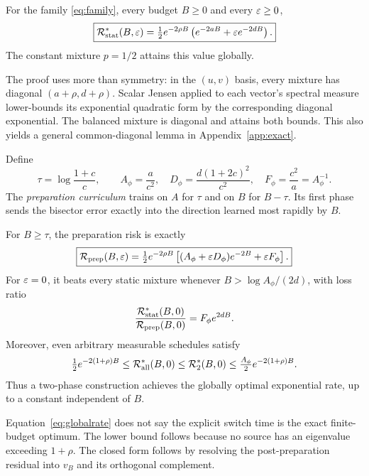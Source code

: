 \begin{theorem}\label{thm:static}
For the family \eqref{eq:family}, every budget $B\ge0$ and every $\varepsilon\ge0$,
\begin{equation}
 \boxed{\mathcal R_{\mathrm{stat}}^*(B,\varepsilon)=\tfrac12e^{-2\rho B}
        \left(e^{-2aB}+\varepsilon e^{-2dB}\right).}\label{eq:static}
\end{equation}
The constant mixture $p=1/2$ attains this value globally.
\end{theorem}
The proof uses more than symmetry: in the $(u,v)$ basis, every mixture has diagonal $(a+\rho,d+\rho)$. Scalar Jensen applied to each vector's spectral measure lower-bounds its exponential quadratic form by the corresponding diagonal exponential. The balanced mixture is diagonal and attains both bounds. This also yields a general common-diagonal lemma in Appendix~\ref{app:exact}.

Define
\begin{equation}
 \tau=\log\frac{1+c}{c},\qquad
 A_\phi=\frac{a}{c^2},\quad D_\phi=\frac{d(1+2c)^2}{c^2},\quad F_\phi=\frac{c^2}{a}=A_\phi^{-1}.
\end{equation}
The \emph{preparation curriculum} trains on $A$ for $\tau$ and on $B$ for $B-\tau$. Its first phase sends the bisector error exactly into the direction learned most rapidly by $B$.

\begin{theorem}\label{thm:prep}
For $B\ge\tau$, the preparation risk is exactly
\begin{equation}
 \boxed{\mathcal R_{\mathrm{prep}}(B,\varepsilon)=\tfrac12e^{-2\rho B}
 \left[(A_\phi+\varepsilon D_\phi)e^{-2B}+\varepsilon F_\phi\right].}\label{eq:prep}
\end{equation}
For $\varepsilon=0$, it beats every static mixture whenever
$B>\log A_\phi/(2d)$, with loss ratio
\begin{equation}
 \frac{\mathcal R_{\mathrm{stat}}^*(B,0)}{\mathcal R_{\mathrm{prep}}(B,0)}=F_\phi e^{2dB}.\label{eq:ratio}
\end{equation}
Moreover, even arbitrary measurable schedules satisfy
\begin{equation}
 \tfrac12e^{-2(1+\rho)B}\le\mathcal R_{\mathrm{all}}^*(B,0)
 \le\mathcal R_{2}^*(B,0)\le\tfrac{A_\phi}{2}e^{-2(1+\rho)B}.\label{eq:globalrate}
\end{equation}
Thus a two-phase construction achieves the globally optimal exponential rate, up to a constant independent of $B$.
\end{theorem}
Equation~\eqref{eq:globalrate} does not say the explicit switch time is the exact finite-budget optimum. The lower bound follows because no source has an eigenvalue exceeding $1+\rho$. The closed form follows by resolving the post-preparation residual into $v_B$ and its orthogonal complement.

